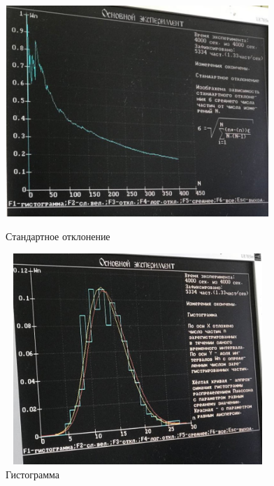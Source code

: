 \documentclass[a4paper,14pt]{extarticle}
\begin{document}
	\newpage
	\begin{figure}
		\includegraphics[width= 10cm, height= 8cm]{3.jpg}
		\caption{Стандартное отклонение}
		
		
		
		\includegraphics[width= 10cm, height= 8cm]{4.jpg}
		\caption{Гистограмма}
	\end{figure}
	
\end{document}
